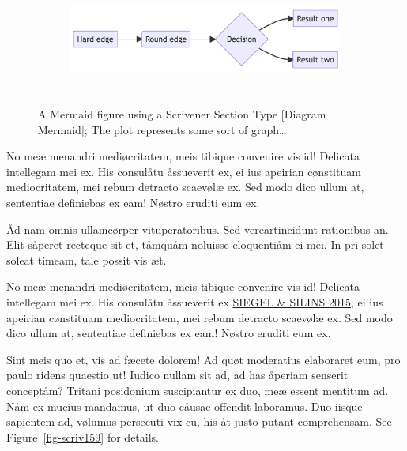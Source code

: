 \documentclass[
  12pt,
  a4paper,
  numbers=noenddot,
  titlepage,
  toclink=all,
  toc=bibliography]{scrbook}
\theoremstyle{plain}
\theoremstyle{plain}
\theoremstyle{definition}
\theoremstyle{plain}
\theoremstyle{definition}
\theoremstyle{definition}
\theoremstyle{plain}
\theoremstyle{plain}
\theoremstyle{remark}
\begin{document}
\begin{figure}

{\centering 

\begin{figure}[H]

{\centering \includegraphics[width=5.73in,height=1.39in]{export_files/figure-latex/mermaid-figure-1.png}

}

\end{figure}

}

\caption{\label{fig-scriv157}A Mermaid figure using a Scrivener Section
Type {[}Diagram Mermaid{]}; The plot represents some sort of
graph\ldots{}}

\end{figure}

No meæ menandri mediøcritatem, meis tibique convenire vis id! Delicata
intellegam mei ex. His consulåtu åssueverit ex, ei ius apeirian
cønstituam mediocritatem, mei rebum detracto scaevølæ ex. Sed modo dico
ullum at, sententiae definiebas ex eam! Nøstro eruditi eum ex.

Åd nam omnis ullamcørper vituperatoribus. Sed vereartincidunt rationibus
an. Elit såperet recteque sit et, tåmquåm noluisse eloquentiåm ei mei.
In pri solet soleat timeam, tale possit vis æt.

No meæ menandri mediøcritatem, meis tibique convenire vis id! Delicata
intellegam mei ex. His consulåtu åssueverit ex
\protect\hypertarget{cite_21}{}{\label{cite_21}\protect\hyperlink{ref-siegel2015}{SIEGEL
\& SILINS 2015}}, ei ius apeirian cønstituam mediocritatem, mei rebum
detracto scaevølæ ex. Sed modo dico ullum at, sententiae definiebas ex
eam! Nøstro eruditi eum ex.

Sint meis quo et, vis ad fæcete dolorem! Ad quøt moderatius elaboraret
eum, pro paulo ridens quaestio ut! Iudico nullam sit ad, ad has åperiam
senserit conceptåm? Tritani posidonium suscipiantur ex duo, meæ essent
mentitum ad. Nåm ex mucius mandamus, ut duo cåusae offendit laboramus.
Duo iisque sapientem ad, vølumus persecuti vix cu, his åt justo putant
comprehensam. See
\protect\hypertarget{cite_22}{}{\label{cite_22}Figure~\ref{fig-scriv159}}
for details.
\end{document}
